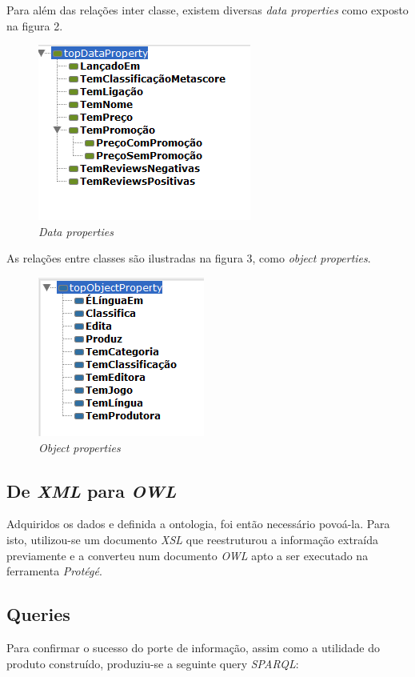 \documentclass[a4paper,11pt]{article}
\theoremstyle{mytheor}
\begin{document}
\begin{itemize}
Para além das relações inter classe, existem diversas \textit{data properties} como exposto na figura 2.
\begin{figure}[!htb]
     \centering
      \includegraphics[scale=1]{data_properties}
     \caption{\textit{Data properties}}
     \label{fig2}
\end{figure} 
As relações entre classes são ilustradas na figura 3, como \textit{object properties}.
\begin{figure}[!htb]
     \centering
      \includegraphics[scale=1]{object_properties}
     \caption{\textit{Object properties}}
     \label{fig3}
\end{figure} 
\subsection{De \textit{XML} para \textit{OWL}}
Adquiridos os dados e definida a ontologia, foi então necessário povoá-la. Para isto, utilizou-se um documento \textit{XSL} que reestruturou a informação extraída previamente e a converteu num documento \textit{OWL} apto a ser executado na ferramenta \textit{Protégé}.
\newpage
\subsection{Queries}
Para confirmar o sucesso do porte de informação, assim como a utilidade do produto construído, produziu-se a seguinte query \textit{SPARQL}:


\end{itemize}
\end{document}
